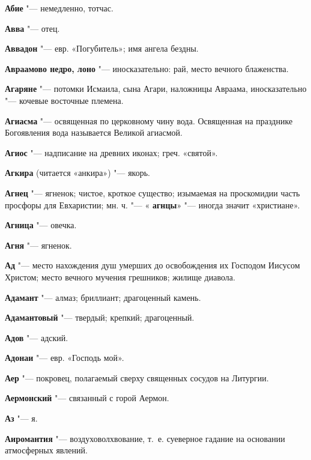 \renewcommand{\ornament}{uzor_begin_4}

\begin{mymulticols}\footnotesize


\noindent\textbf{Абие} "--- немедленно, тотчас. 

\noindent\textbf{Авва} "--- отец. 

\noindent\textbf{Аввадон} "--- евр. «Погубитель»; имя ангела бездны. 

\noindent\textbf{Авраамово недро, лоно} "--- иносказательно: рай, место вечного блаженства. 

\noindent\textbf{Агаряне} "--- потомки Исмаила, сына Агари, наложницы Авраама, иносказательно "--- кочевые восточные племена. 

\noindent\textbf{Агиасма} "--- освященная по церковному чину вода. Освященная на празднике Богоявления вода называется Великой агиасмой. 

\noindent\textbf{Агиос} "--- надписание на древних иконах; греч. «святой». 

\noindent\textbf{Агкира} (читается «анкира») "--- якорь. 

\noindent\textbf{Агнец} "--- ягненок; чистое, кроткое существо; изымаемая на проскомидии часть просфоры для Евхаристии; мн. ч. "--- « \noindent\textbf{агнцы}» "--- иногда значит «христиане». 

\noindent\textbf{Агница} "--- овечка. 

\noindent\textbf{Агня} "--- ягненок. 

\noindent\textbf{Ад} "--- место нахождения душ умерших до освобождения их Господом Иисусом Христом; место вечного мучения грешников; жилище диавола. 

\noindent\textbf{Адамант} "--- алмаз; бриллиант; драгоценный камень. 

\noindent\textbf{Адамантовый} "--- твердый; крепкий; драгоценный. 

\noindent\textbf{Адов} "--- адский. 

\noindent\textbf{Адонаи} "--- евр. «Господь мой». 

\noindent\textbf{Аер} "--- покровец, полагаемый сверху священных сосудов на Литургии. 

\noindent\textbf{Аермонский} "--- связанный с горой Аермон. 

\noindent\textbf{Аз} "--- я. 

\noindent\textbf{Аиромантия} "--- воздуховолхвование, т.~е. суеверное гадание на основании атмосферных явлений. 


\end{mymulticols}
